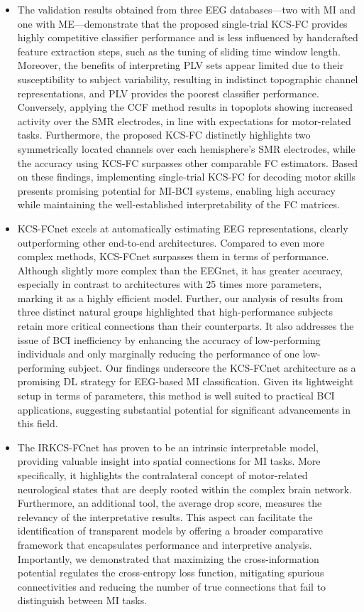 \begin{itemize}
    \item The validation results obtained from three EEG databases—two with MI and one with ME—demonstrate that the proposed single-trial KCS-FC provides highly competitive classifier performance and is less influenced by handcrafted feature extraction steps, such as the tuning of sliding time window length. Moreover, the benefits of interpreting PLV sets appear limited due to their susceptibility to subject variability, resulting in indistinct topographic channel representations, and PLV provides the poorest classifier performance. Conversely, applying the CCF method results in topoplots showing increased activity over the SMR electrodes, in line with expectations for motor-related tasks. Furthermore, the proposed KCS-FC distinctly highlights two symmetrically located channels over each hemisphere's SMR electrodes, while the accuracy using KCS-FC surpasses other comparable FC estimators. Based on these findings, implementing single-trial KCS-FC for decoding motor skills presents promising potential for MI-BCI systems, enabling high accuracy while maintaining the well-established interpretability of the FC matrices.

    \item KCS-FCnet excels at automatically estimating EEG representations, clearly outperforming other end-to-end architectures. Compared to even more complex methods, KCS-FCnet surpasses them in terms of performance. Although slightly more complex than the EEGnet, it has greater accuracy, especially in contrast to architectures with 25 times more parameters, marking it as a highly efficient model. Further, our analysis of results from three distinct natural groups highlighted that high-performance subjects retain more critical connections than their counterparts. It also addresses the issue of BCI inefficiency by enhancing the accuracy of low-performing individuals and only marginally reducing the performance of one low-performing subject. Our findings underscore the KCS-FCnet architecture as a promising DL strategy for EEG-based MI classification. Given its lightweight setup in terms of parameters, this method is well suited to practical BCI applications, suggesting substantial potential for significant advancements in this field.

    \item The IRKCS-FCnet has proven to be an intrinsic interpretable model, providing valuable insight into spatial connections for MI tasks. More specifically, it highlights the contralateral concept of motor-related neurological states that are deeply rooted within the complex brain network. Furthermore, an additional tool, the average drop score, measures the relevancy of the interpretative results. This aspect can facilitate the identification of transparent models by offering a broader comparative framework that encapsulates performance and interpretive analysis. Importantly, we demonstrated that maximizing the cross-information potential regulates the cross-entropy loss function, mitigating spurious connectivities and reducing the number of true connections that fail to distinguish between MI tasks.
  
\end{itemize}


